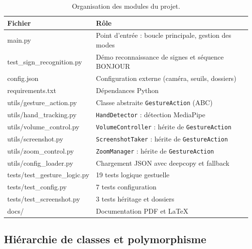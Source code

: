 \documentclass[12pt,a4paper]{article}
\begin{document}
\begin{table}[H]
\centering
\caption{Organisation des modules du projet.}
\label{tab:modules}
\small
\begin{tabularx}{\textwidth}{>{\ttfamily}p{5.5cm} X}
\toprule
\textbf{Fichier} & \textbf{R\^ole} \\
\midrule
main.py & Point d'entr\'ee : boucle principale, gestion des modes \\
test\_sign\_recognition.py & D\'emo reconnaissance de signes et s\'equence BONJOUR \\
config.json & Configuration externe (cam\'era, seuils, dossiers) \\
requirements.txt & D\'ependances Python \\
\midrule
utils/gesture\_action.py & Classe abstraite \texttt{GestureAction} (ABC) \\
utils/hand\_tracking.py & \texttt{HandDetector} : d\'etection MediaPipe \\
utils/volume\_control.py & \texttt{VolumeController} : h\'erite de \texttt{GestureAction} \\
utils/screenshot.py & \texttt{ScreenshotTaker} : h\'erite de \texttt{GestureAction} \\
utils/zoom\_control.py & \texttt{ZoomManager} : h\'erite de \texttt{GestureAction} \\
utils/config\_loader.py & Chargement JSON avec deepcopy et fallback \\
\midrule
tests/test\_gesture\_logic.py & 19 tests logique gestuelle \\
tests/test\_config.py & 7 tests configuration \\
tests/test\_screenshot.py & 3 tests h\'eritage et dossiers \\
docs/ & Documentation PDF et \LaTeX \\
\bottomrule
\end{tabularx}
\end{table}

\subsection{Hi\'erarchie de classes et polymorphisme}
\end{document}
